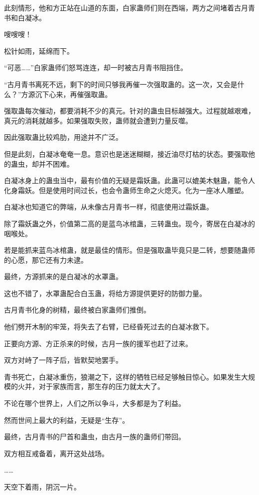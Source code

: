 \begin{this_body}
此刻情形，他和方正站在山道的东面，白家蛊师们则在西端，两方之间堵着古月青书和白凝冰。

嗖嗖嗖！

松针如雨，延绵而下。

“可恶……”白家蛊师们怒骂连连，却一时被古月青书阻挡住。

“古月青书离死不远，剩下的时间只够我再催一次强取蛊的。这一次，又会是什么？”方源沉下心来，再催强取蛊。

强取蛊每次催动，都要消耗不少的真元。针对的蛊虫目标越强大。过程就越艰难，真元的消耗就越多。如果强取失败，蛊师就会遭到力量反噬。

因此强取蛊比较鸡肋，用途并不广泛。

但是此刻，白凝冰奄奄一息。意识也是迷迷糊糊，接近油尽灯枯的状态。要强取他的蛊虫，却并不困难。

白凝冰身上的蛊虫当中，最有价值的无疑是霜妖蛊。此蛊可以媲美木魅蛊，能令人化身霜妖。但是使用时间过长，也会令蛊师生命之火熄灭。化为一座冰人雕塑。

白凝冰也知道它的弊端，从未像古月青书一样，彻底使用过霜妖蛊。

除了霜妖蛊之外，价值第二高的是蓝鸟冰棺蛊，三转蛊虫。现今，寄居在白凝冰的咽喉处。

若是能抓来蓝鸟冰棺蛊，就是最佳的情形。但是强取蛊毕竟只是二转，想要随蛊师的心愿，那它还有力未逮。

最终，方源抓来的是白凝冰的水罩蛊。

这也不错了，水罩蛊配合白玉蛊，将给方源提供更好的防御力量。

古月青书化身的树精，最终被白家蛊师们推倒。

他们劈开木制的牢笼，将失去了右臂，已经昏死过去的白凝冰救下。

正要向方源、方正杀来的时候，古月一族的援军也赶了过来。

双方对峙了一阵子后，皆默契地罢手。

青书死亡，白凝冰重伤，狼潮之下，这样的牺牲已经足够触目惊心。如果发生大规模的火并，对于家族而言，那生存的压力就太大了。

不论在哪个世界上，人们之所以争斗，大多都是为了利益。

然而世间上最大的利益，无疑是“生存”。

最终，古月青书的尸首和蛊虫，由古月一族的蛊师们带回。

双方相互戒备着，离开这处战场。

……

天空下着雨，阴沉一片。


\end{this_body}
